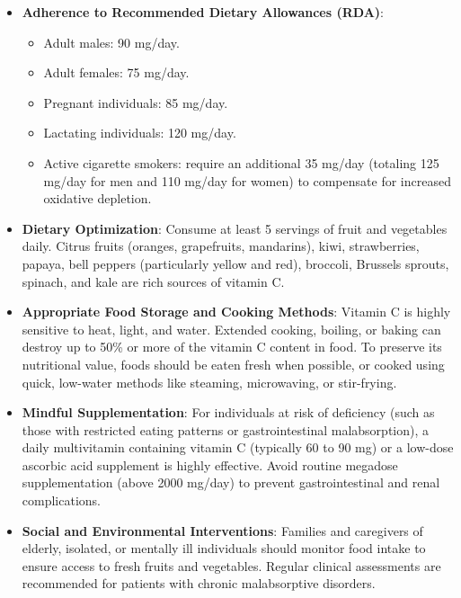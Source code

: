 \begin{itemize}
    \item \textbf{Adherence to Recommended Dietary Allowances (RDA)}:
        \begin{itemize}
            \item Adult males: 90 mg/day.
            \item Adult females: 75 mg/day.
            \item Pregnant individuals: 85 mg/day.
            \item Lactating individuals: 120 mg/day.
            \item Active cigarette smokers: require an additional 35 mg/day (totaling 125 mg/day for men and 110 mg/day for women) to compensate for increased oxidative depletion.
        \end{itemize}
    \item \textbf{Dietary Optimization}: Consume at least 5 servings of fruit and vegetables daily. Citrus fruits (oranges, grapefruits, mandarins), kiwi, strawberries, papaya, bell peppers (particularly yellow and red), broccoli, Brussels sprouts, spinach, and kale are rich sources of vitamin C.
    \item \textbf{Appropriate Food Storage and Cooking Methods}: Vitamin C is highly sensitive to heat, light, and water. Extended cooking, boiling, or baking can destroy up to 50\% or more of the vitamin C content in food. To preserve its nutritional value, foods should be eaten fresh when possible, or cooked using quick, low-water methods like steaming, microwaving, or stir-frying.
    \item \textbf{Mindful Supplementation}: For individuals at risk of deficiency (such as those with restricted eating patterns or gastrointestinal malabsorption), a daily multivitamin containing vitamin C (typically 60 to 90 mg) or a low-dose ascorbic acid supplement is highly effective. Avoid routine megadose supplementation (above 2000 mg/day) to prevent gastrointestinal and renal complications.
    \item \textbf{Social and Environmental Interventions}: Families and caregivers of elderly, isolated, or mentally ill individuals should monitor food intake to ensure access to fresh fruits and vegetables. Regular clinical assessments are recommended for patients with chronic malabsorptive disorders.
\end{itemize}

